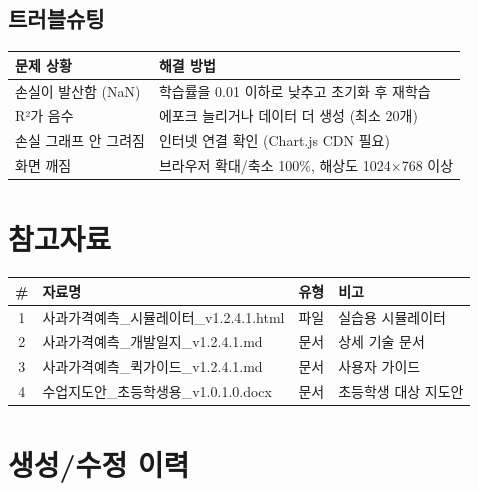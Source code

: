 \documentclass[11pt,a4paper]{article}
\begin{document}
\subsection{트러블슈팅}

\begin{center}
\begin{tabular}{|p{4cm}|p{10cm}|}
\hline
\textbf{문제 상황} & \textbf{해결 방법} \\
\hline
손실이 발산함 (NaN) & 학습률을 0.01 이하로 낮추고 초기화 후 재학습 \\
\hline
R²가 음수 & 에포크 늘리거나 데이터 더 생성 (최소 20개) \\
\hline
손실 그래프 안 그려짐 & 인터넷 연결 확인 (Chart.js CDN 필요) \\
\hline
화면 깨짐 & 브라우저 확대/축소 100\%, 해상도 1024×768 이상 \\
\hline
\end{tabular}
\end{center}

\section{참고자료}

\begin{center}
\begin{tabular}{|c|p{6.5cm}|c|p{4cm}|}
\hline
\textbf{\#} & \textbf{자료명} & \textbf{유형} & \textbf{비고} \\
\hline
1 & 사과가격예측\_시뮬레이터\_v1.2.4.1.html & 파일 & 실습용 시뮬레이터 \\
\hline
2 & 사과가격예측\_개발일지\_v1.2.4.1.md & 문서 & 상세 기술 문서 \\
\hline
3 & 사과가격예측\_퀵가이드\_v1.2.4.1.md & 문서 & 사용자 가이드 \\
\hline
4 & 수업지도안\_초등학생용\_v1.0.1.0.docx & 문서 & 초등학생 대상 지도안 \\
\hline
\end{tabular}
\end{center}

\section{생성/수정 이력}
\end{document}
